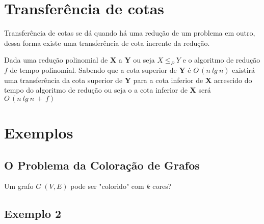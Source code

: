 \documentclass[12pt,a4papper]{article}
\begin{document}
\section{Transferência de cotas}
Transferência de cotas se dá quando há uma redução de um problema em outro, dessa forma existe uma transferência de cota inerente da redução.

Dada uma redução polinomial de \textbf{X} a \textbf{Y} ou seja $X \leq_P Y$ e o algoritmo de redução $f$ de tempo polinomial. Sabendo que a cota superior de \textbf{Y} é $O\,(n\:lg\:n)$ existirá uma transferência da cota superior de \textbf{Y} para a cota inferior de \textbf{X} acrescido do tempo do algoritmo de redução ou seja o a cota inferior de \textbf{X} será $O\,(n\:lg\:n\, + \,f)$

\section{Exemplos}


\subsection{O Problema da Coloração de Grafos}
Um grafo $G\:(V,E)$ pode ser "colorido" com $k$ cores?

\subsection{Exemplo 2}
\end{document}
